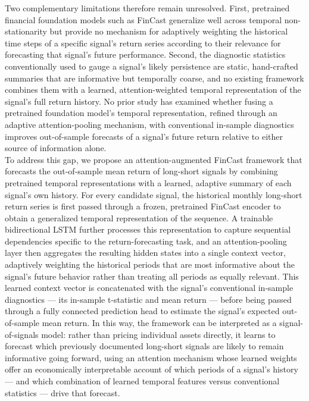 \documentclass[pdflatex,sn-mathphys-num]{sn-jnl}%
\theoremstyle{thmstyleone}%
\theoremstyle{thmstyletwo}%
\theoremstyle{thmstylethree}%
\begin{document}
Two complementary limitations therefore remain unresolved. First, pretrained financial foundation models such as FinCast generalize well across temporal non-stationarity but provide no mechanism for adaptively weighting the historical time steps of a specific signal's return series according to their relevance for forecasting that signal's future performance. Second, the diagnostic statistics conventionally used to gauge a signal's likely persistence are static, hand-crafted summaries that are informative but temporally coarse, and no existing framework combines them with a learned, attention-weighted temporal representation of the signal's full return history. No prior study has examined whether fusing a pretrained foundation model's temporal representation, refined through an adaptive attention-pooling mechanism, with conventional in-sample diagnostics improves out-of-sample forecasts of a signal's future return relative to either source of information alone.\\

To address this gap, we propose an attention-augmented FinCast framework that forecasts the out-of-sample mean return of long-short signals by combining pretrained temporal representations with a learned, adaptive summary of each signal's own history. For every candidate signal, the historical monthly long-short return series is first passed through a frozen, pretrained FinCast encoder to obtain a generalized temporal representation of the sequence. A trainable bidirectional LSTM further processes this representation to capture sequential dependencies specific to the return-forecasting task, and an attention-pooling layer then aggregates the resulting hidden states into a single context vector, adaptively weighting the historical periods that are most informative about the signal's future behavior rather than treating all periods as equally relevant. This learned context vector is concatenated with the signal's conventional in-sample diagnostics — its in-sample t-statistic and mean return — before being passed through a fully connected prediction head to estimate the signal's expected out-of-sample mean return. In this way, the framework can be interpreted as a signal-of-signals model: rather than pricing individual assets directly, it learns to forecast which previously documented long-short signals are likely to remain informative going forward, using an attention mechanism whose learned weights offer an economically interpretable account of which periods of a signal's history — and which combination of learned temporal features versus conventional statistics — drive that forecast.\\
\end{document}
